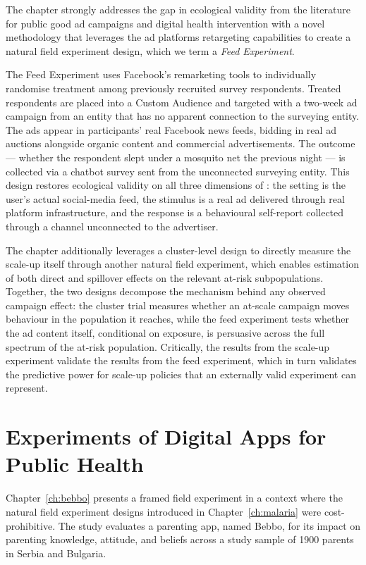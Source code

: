 The chapter strongly addresses the gap in ecological validity from the literature for public good ad campaigns and digital health intervention with a novel methodology that leverages the ad platforms retargeting capabilities to create a natural field experiment design, which we term a \emph{Feed Experiment}. 

The Feed Experiment uses Facebook's remarketing tools to individually randomise treatment among previously recruited survey respondents. Treated respondents are placed into a Custom Audience and targeted with a two-week ad campaign from an entity that has no apparent connection to the surveying entity. The ads appear in participants' real Facebook news feeds, bidding in real ad auctions alongside organic content and commercial advertisements. The outcome --- whether the respondent slept under a mosquito net the previous night --- is collected via a chatbot survey sent from the unconnected surveying entity. This design restores ecological validity on all three dimensions of \citet{Schmuckler2001}: the setting is the user's actual social-media feed, the stimulus is a real ad delivered through real platform infrastructure, and the response is a behavioural self-report collected through a channel unconnected to the advertiser. 

The chapter additionally leverages a cluster-level design to directly measure the scale-up itself through another natural field experiment, which enables estimation of both direct and spillover effects on the relevant at-risk subpopulations. Together, the two designs decompose the mechanism behind any observed campaign effect: the cluster trial measures whether an at-scale campaign moves behaviour in the population it reaches, while the feed experiment tests whether the ad content itself, conditional on exposure, is persuasive across the full spectrum of the at-risk population. Critically, the results from the scale-up experiment validate the results from the feed experiment, which in turn validates the predictive power for scale-up policies that an externally valid experiment can represent. 

\section{Experiments of Digital Apps for Public Health}
\label{sec:intro:digital-apps}

Chapter~\ref{ch:bebbo} presents a framed field experiment in a context where the natural field experiment designs introduced in Chapter~\ref{ch:malaria} were cost-prohibitive. The study evaluates a parenting app, named Bebbo, for its impact on parenting knowledge, attitude, and beliefs across a study sample of 1900 parents in Serbia and Bulgaria. 
 
